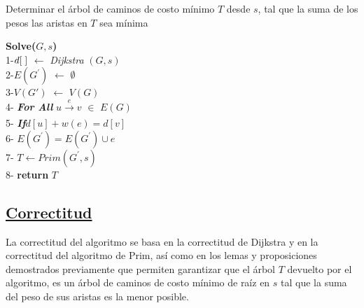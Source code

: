 \documentclass{article}
\begin{document}
    \begin{algorithm}[H]
        \caption{Determinar el \'arbol de caminos de costo m\'inimo $T$ desde $s$, tal que la suma de los pesos las aristas en $T$ sea m\'inima}
        \textbf{Solve($G,s$)}\\ 
        1-\hspace*{0.5em}$d[\hspace*{0.1cm}]$ $\leftarrow $ \textit{Dijkstra} $\left(G,s\right)$ \\  
        2-\hspace*{0.5em}$E (G^{'})$ $\leftarrow$ $\emptyset$ \\ 
        3-\hspace*{0.5em}$V(G')$ $\leftarrow$ $V(G)$\\ 
        4-\hspace*{0.5em} \textbf{\textit{For All }} $u \xrightarrow[]{e} v$  $\in$ $E(G)$\\ 
        5-\hspace*{3em} \textbf{\textit{If}}$d[u] + w(e) = d[v] $\\
        6-\hspace*{6em} $E(G^{'}) = E(G^{'})  \cup  e $ \\ 
        7-\hspace*{0.5em} $T \leftarrow  Prim(G^{'} , s)$\\
        8-\hspace*{0.5em} \textbf{return } $T$ 
    \end{algorithm}
    
    \subsection{\underline{Correctitud}}

    \noindent La correctitud del algoritmo se basa en la correctitud  de Dijkstra  
    y en la correctitud del algoritmo de Prim, as\'i como en los lemas y proposiciones demostrados previamente 
    que permiten garantizar  que el \'arbol $T$ devuelto por el algoritmo, es un \'arbol de caminos de costo
    m\'inimo de ra\'iz en $s$ tal que la suma del peso de sus aristas es la menor posible.
    
\end{document}
